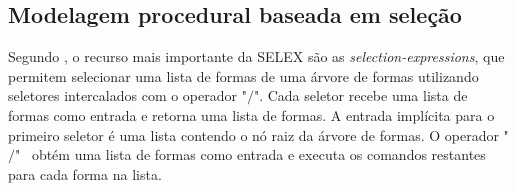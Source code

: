 \begin{figure}[h!]
	\centering
	\captionsetup{width=15cm}
	{}	
\end{figure}

\newpage

\subsection{Modelagem procedural baseada em seleção}
\label{sec:modelagem_selecao}

Segundo , o recurso mais importante da \gls{SELEX} são as \textit{selection-expressions}, que permitem selecionar uma lista de formas de uma árvore de formas utilizando seletores intercalados com o operador "$/$". Cada seletor recebe uma lista de formas como entrada e retorna uma lista de formas. A entrada implícita para o primeiro seletor é uma lista contendo o nó raiz da árvore de formas. O operador "$/$" \, obtém uma lista de formas como entrada e executa os comandos restantes para cada forma na lista. 

